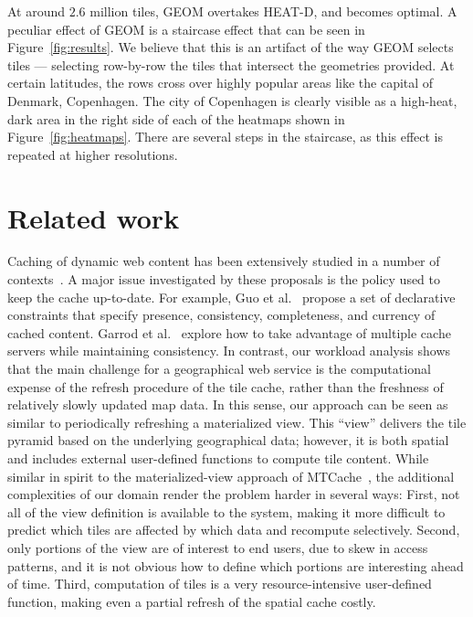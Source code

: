 \documentclass[11pt, oneside]{report}
\begin{document}
At around $2.6$ million tiles, GEOM overtakes HEAT-D, and becomes optimal. A peculiar effect of GEOM is a staircase effect that can be seen in Figure~\ref{fig:results}. We believe that this is an artifact of the way GEOM selects tiles --- selecting row-by-row the tiles that intersect the geometries provided. At certain latitudes, the rows cross over highly popular areas like the capital of Denmark, Copenhagen. The city of Copenhagen is clearly visible as a high-heat, dark area in the right side of each of the heatmaps shown in Figure~\ref{fig:heatmaps}. There are several steps in the staircase, as this effect is repeated at higher resolutions.

\section{Related work}
\label{sec:tileheat:related:work}

Caching of dynamic web content has been extensively studied in a number of contexts~\cite{DDT+01:DynamicContentAcceleration,GMA+08:Ferdinand,GLR05:GoodEnough,LGZ04:MTCache,LKM+02:DBCache,Moh01:WebCaching}. A major issue investigated by these proposals is the policy used to keep the cache up-to-date. 
For example, Guo et al.~\cite{GLR05:GoodEnough} propose a set of declarative constraints that specify presence,  consistency, completeness, and currency of cached content. 
Garrod et al.~\cite{GMA+08:Ferdinand} explore how to take advantage of multiple cache servers while maintaining consistency. In contrast, our workload analysis shows that the main challenge for a geographical web service is the computational expense of the refresh procedure of the tile cache, rather than the freshness of relatively slowly updated map data. In this sense, our approach can be seen as similar to periodically refreshing a materialized view. This  ``view'' delivers the tile pyramid based on the underlying geographical data; however, it is both spatial and includes external user-defined functions to compute tile content. While similar in spirit to the materialized-view approach of MTCache~\cite{LGZ04:MTCache}, the additional complexities of our domain render the problem harder in several ways: First, not all of the view definition is available to the system, making it more difficult to predict which tiles are affected by which data and recompute selectively. Second, only portions of the view are of interest to end users, due to skew in access patterns, and it is not obvious how to define which portions are interesting ahead of time. Third, computation of tiles is a very resource-intensive user-defined function, making even a partial refresh of the spatial cache costly.  
 
\end{document}
